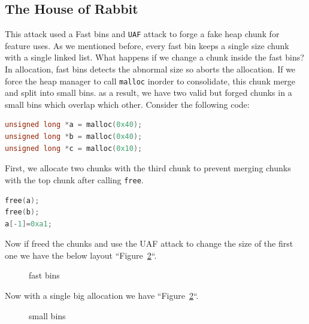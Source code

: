 \documentclass{masterthesis}
\newcommand*\fb{fast bins}
\newcommand*\sbs{small bins}
\newcommand*\Fb{Fast bins\xspace}
\newcommand*\mallocc{\lstinline{malloc}}
\newcommand*\freec{\lstinline{free}}
\begin{document}
\subsection{The House of Rabbit}

This attack used a \Fb{} and \lstinline{UAF} attack to forge a fake heap chunk for feature uses. As we mentioned before, every fast bin keeps a single size chunk with a single linked list. What happens if we change a chunk inside the \fb{}? In allocation, \fb{} detects the abnormal size so aborts the allocation. If we force the heap manager to call \mallocc{} inorder to consolidate, this chunk merge and split into \sbs{}. as a result, we have two valid but forged chunks in a \sbs{} which overlap which other. Consider the following code:

\begin{lstlisting}[language=c,frame=tlrb]
unsigned long *a = malloc(0x40);
unsigned long *b = malloc(0x40);
unsigned long *c = malloc(0x10);
\end{lstlisting}

First, we allocate two chunks with the third chunk to prevent merging chunks with the top chunk after calling \freec{}.

\begin{lstlisting}[language=c,frame=tlrb]
free(a);
free(b);
a[-1]=0xa1;
\end{lstlisting}

Now if freed the chunks and use the UAF attack to change the size of the first one we have the below layout ``Figure~\ref{fig:gdb9}``.

\begin{figure}[h!]
 \caption{\fb{}}
  \label{fig:gdb8}
\end{figure}

Now with a single big allocation we have ``Figure~\ref{fig:gdb9}``.
\begin{figure}[h!]
 \caption{\sbs{}}
  \label{fig:gdb9}
\end{figure}
\end{document}
